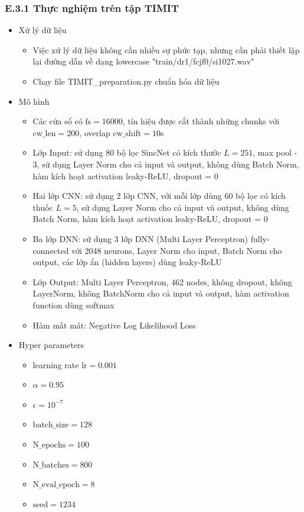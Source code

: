 \documentclass{article}
\begin{document}
	\subsubsection{E.3.1 Thực nghiệm trên tập TIMIT}
	\begin{itemize}
		\item Xử lý dữ liệu
		\begin{itemize}
			\item Việc xử lý dữ liệu không cần nhiều sự phức tạp, nhưng cần phải thiết lập lại đường dẫn về dạng lowercase "train/dr1/fcjf0/si1027.wav"
			\item Chạy file TIMIT\_preparation.py chuẩn hóa dữ liệu
		\end{itemize}
		\item Mô hình 
		\begin{itemize}
			\item Các cửa sổ có $\text{fs} = 16000$, tín hiệu được cắt thành những chunks với $\text{cw\_len}=200$, overlap $\text{cw\_shift}=10$s
			\item Lớp Input: sử dụng 80 bộ lọc SincNet có kích thước $L=251$, max pool - 3, sử dụng Layer Norm cho cả input và output, không dùng Batch Norm, hàm kích hoạt activation leaky-ReLU, dropout = 0
			\item Hai lớp CNN: sử dụng 2 lớp CNN, với mỗi lớp dùng 60 bộ lọc có kích thuốc $L=5$, sử dụng Layer Norm cho cả input và output, không dùng Batch Norm, hàm kích hoạt activation leaky-ReLU, dropout = 0
			\item Ba lớp DNN: sử dụng 3 lớp DNN (Multi Layer Perceptron) fully-connected với 2048 neurons, Layer Norm cho input, Batch Norm cho output, các lớp ẩn (hidden layers) dùng leaky-ReLU
			\item Lớp Output: Multi Layer Perceptron, 462 nodes, không dropout, không LayerNorm, không BatchNorm cho cả input và output, hàm activation function dùng softmax
			\item Hàm mất mát: Negative Log Likelihood Loss
		\end{itemize}
		\item Hyper parameters
		\begin{itemize}
			\item learning rate $\text{lr} = 0.001$
			\item $\alpha = 0.95$
			\item $\epsilon = 10^{-7}$
			\item $\text{batch\_size}=128$
			\item $\text{N\_epochs}=100$
			\item $\text{N\_batches}=800$
			\item $\text{N\_eval\_epoch}=8$
			\item $\text{seed}=1234$
		\end{itemize}
	\end{itemize}
\end{document}
